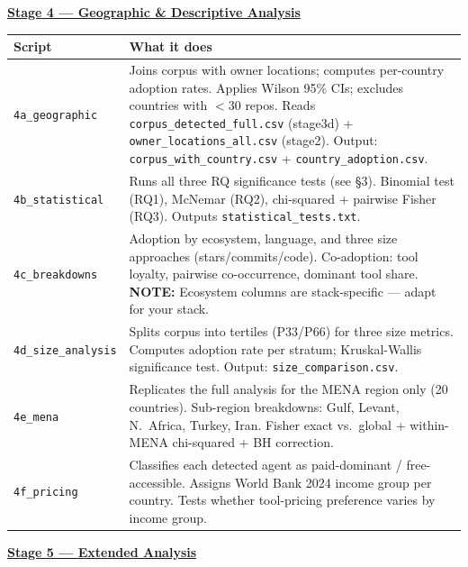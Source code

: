 \documentclass[9pt,a4paper]{article}
\begin{document}
\vspace{5pt}
\noindent\textbf{\underline{Stage 4 --- Geographic \& Descriptive Analysis}}

\begin{tabular}{@{}lp{14cm}@{}}
\toprule
Script & What it does \\
\midrule
\cellcolor{stagegray}\texttt{4a\_geographic} &
  Joins corpus with owner locations; computes per-country adoption rates.
  Applies Wilson 95\% CIs; excludes countries with $<$30 repos.
  Reads \texttt{corpus\_detected\_full.csv} (stage3d) + \texttt{owner\_locations\_all.csv} (stage2).
  Output: \texttt{corpus\_with\_country.csv} + \texttt{country\_adoption.csv}. \\[2pt]
\cellcolor{stagegray}\texttt{4b\_statistical} &
  Runs all three RQ significance tests (see \S 3).
  Binomial test (RQ1), McNemar (RQ2), chi-squared + pairwise Fisher (RQ3).
  Outputs \texttt{statistical\_tests.txt}. \\[2pt]
\cellcolor{stagegray}\texttt{4c\_breakdowns} &
  Adoption by ecosystem, language, and three size approaches (stars/commits/code).
  Co-adoption: tool loyalty, pairwise co-occurrence, dominant tool share.
  \textbf{NOTE:} Ecosystem columns are stack-specific --- adapt for your stack. \\[2pt]
\cellcolor{stagegray}\texttt{4d\_size\_analysis} &
  Splits corpus into tertiles (P33/P66) for three size metrics.
  Computes adoption rate per stratum; Kruskal-Wallis significance test.
  Output: \texttt{size\_comparison.csv}. \\[2pt]
\cellcolor{stagegray}\texttt{4e\_mena} &
  Replicates the full analysis for the MENA region only (20 countries).
  Sub-region breakdowns: Gulf, Levant, N.\ Africa, Turkey, Iran.
  Fisher exact vs.\ global + within-MENA chi-squared + BH correction. \\[2pt]
\cellcolor{stagegray}\texttt{4f\_pricing} &
  Classifies each detected agent as paid-dominant / free-accessible.
  Assigns World Bank 2024 income group per country.
  Tests whether tool-pricing preference varies by income group. \\
\bottomrule
\end{tabular}

\vspace{5pt}
\noindent\textbf{\underline{Stage 5 --- Extended Analysis}}
\end{document}
